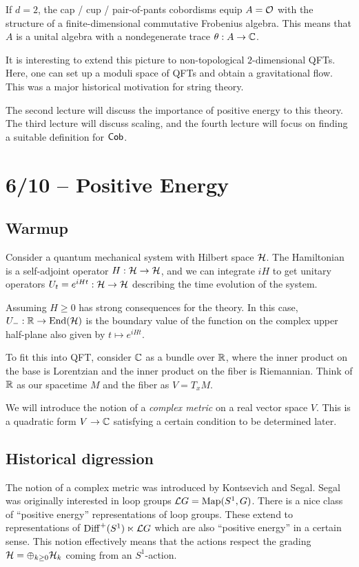 \begin{ex}
	If $d = 2$, the cap / cup / pair-of-pants cobordisms equip $A = \mathcal{O}$ with the structure of a finite-dimensional commutative Frobenius algebra.
	This means that $A$ is a unital algebra with a nondegenerate trace $\theta: A \to \mathbb{C}$.
\end{ex}

It is interesting to extend this picture to non-topological $2$-dimensional QFTs.
Here, one can set up a moduli space of QFTs and obtain a gravitational flow.
This was a major historical motivation for string theory.

The second lecture will discuss the importance of positive energy to this theory.
The third lecture will discuss scaling, and the fourth lecture will focus on finding a suitable definition for $\mathsf{Cob}$.

\section{6/10 -- Positive Energy}

\subsection{Warmup}

Consider a quantum mechanical system with Hilbert space $\mathcal{H}$.
The Hamiltonian is a self-adjoint operator $H: \mathcal{H} \to \mathcal{H}$, and we can integrate $iH$ to get unitary operators $U_t = e^{i H t}: \mathcal{H} \to \mathcal{H}$ describing the time evolution of the system.

Assuming $H \geq 0$ has strong consequences for the theory.
In this case, $U_{-}: \mathbb{R} \to \operatorname{End}(\mathcal{H})$ is the boundary value of the function on the complex upper half-plane also given by $t \mapsto e^{i H t}$.

To fit this into QFT, consider $\mathbb{C}$ as a bundle over $\mathbb{R}$, where the inner product on the base is Lorentzian and the inner product on the fiber is Riemannian.
Think of $\mathbb{R}$ as our spacetime $M$ and the fiber as $V = T_x M$.

We will introduce the notion of a \emph{complex metric} on a real vector space $V$.
This is a quadratic form $V \to \mathbb{C}$ satisfying a certain condition to be determined later.

\subsection{Historical digression}

The notion of a complex metric was introduced by Kontsevich and Segal.
Segal was originally interested in loop groups $\mathcal{L} G = \operatorname{Map}(S^1, G)$.
There is a nice class of ``positive energy'' representations of loop groups.
These extend to representations of $\operatorname{Diff}^+(S^1) \ltimes \mathcal{L} G$ which are also ``positive energy'' in a certain sense.
This notion effectively means that the actions respect the grading $\mathcal{H} = \oplus_{k \geq 0} \mathcal{H}_k$ coming from an $S^1$-action.

